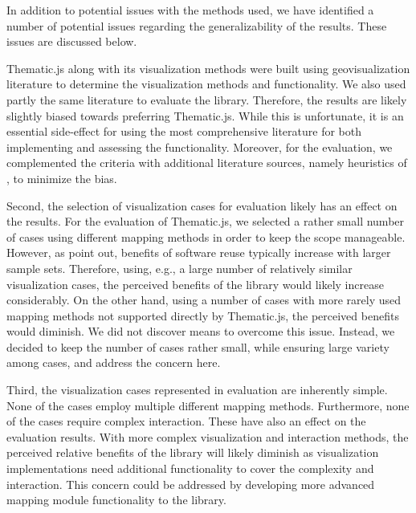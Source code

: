 In addition to potential issues with the methods used, we have identified a number of potential issues regarding the generalizability of the results. These issues are discussed below.

Thematic.js along with its visualization methods were built using geovisualization literature to determine the visualization methods and functionality. We also used partly the same literature to evaluate the library. Therefore, the results are likely slightly biased towards preferring Thematic.js. While this is unfortunate, it is an essential side-effect for using the most comprehensive literature for both implementing and assessing the functionality. Moreover, for the evaluation, we complemented the criteria with additional literature sources, namely heuristics of \citet{zuk_heuristics_2006}, to minimize the bias.

Second, the selection of visualization cases for evaluation likely has an effect on the results. For the evaluation of Thematic.js, we selected a rather small number of cases using different mapping methods in order to keep the scope manageable. However, as \citet{frakes_success_1994} point out, benefits of software reuse typically increase with larger sample sets. Therefore, using, e.g., a large number of relatively similar visualization cases, the perceived benefits of the library would likely increase considerably. On the other hand, using a number of cases with more rarely used mapping methods not supported directly by Thematic.js, the perceived benefits would diminish. We did not discover means to overcome this issue. Instead, we decided to keep the number of cases rather small, while ensuring large variety among cases, and address the concern here.

Third, the visualization cases represented in evaluation are inherently simple. None of the cases employ multiple different mapping methods. Furthermore, none of the cases require complex interaction. These have also an effect on the evaluation results. With more complex visualization and interaction methods, the perceived relative benefits of the library will likely diminish as visualization implementations need additional functionality to cover the complexity and interaction. This concern could be addressed by developing more advanced mapping module functionality to the library.



